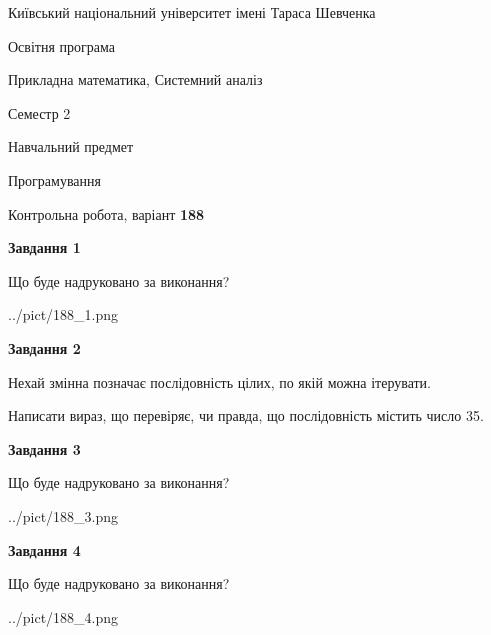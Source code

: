 \documentclass[12pt, ukrainian]{article}
\begin{document}
{{\begin {small}\par
{ \center  Київський національний університет імені Тараса Шевченка \par}
{\parbox {5 cm}{Освітня програма \hfill}{\parbox {8 cm}{Прикладна математика, Системний аналіз \hfill}}\parbox {5 cm}{\hfill Семестр 2}}\par
{\parbox {5 cm} {Навчальний предмет \hfill}\parbox {7 cm}{Програмування \hfill}\parbox {6cm}{\hfill}\par}\vspace{-7pt} \end{small}}{\center Контрольна робота, варіант  \No \textbf
{ 188 }\par}}
{
\begin {large}
{\begin {center}\textbf{Завдання 1}\end {center}}\par
Що буде надруковано за виконання?\par\par
\begin{center}
	{../pict/188_1.png}
\end{center}
\newpage

{\begin {center}\textbf{Завдання 2}\end {center}}\par
Нехай змінна  позначає послідовність цілих, по якій можна ітерувати.

Написати вираз, що перевіряє, чи правда, що послідовність  містить число 35.\par
\newpage

{\begin {center}\textbf{Завдання 3}\end {center}}\par
Що буде надруковано за виконання?\par
\begin{center}
	{../pict/188_3.png}
\end{center}
\newpage

{\begin {center}\textbf{Завдання 4}\end {center}}\par
Що буде надруковано за виконання?\par
\begin{center}
	{../pict/188_4.png}
\end{center}
\newpage


\end{large}}
\end{document}
